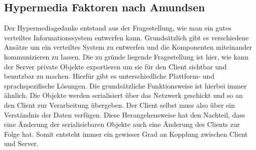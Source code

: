 \subsection{Hypermedia Faktoren nach Amundsen}
Der Hypermediagedanke entstand aus der Fragestellung, wie man ein gutes verteiltes Informationssystem entwerfen kann. Grundsätzlich gibt es verschiedene Ansätze um ein verteiltes System zu entwerfen und die Komponenten miteinander kommunizieren zu lassen. Die zu gründe liegende Fragestellung ist hier, wie kann der Server private Objekte exportieren um sie für den Client sichtbar und benutzbar zu machen. Hierfür gibt es unterschiedliche Plattform- und sprachspezifische Lösungen. Die grundsätzliche Funktionsweise ist hierbei immer ähnlich. Die Objekte werden serialisiert über das Netzwerk geschickt und so an den Client zur Verarbeitung übergeben. Der Client selbst muss also über ein Verständnis der Daten verfügen. Diese Herangehensweise hat den Nachteil, dass eine Änderung der serialisiebaren Objekte auch eine Änderung des Clients zur Folge hat. Somit entsteht immer ein gewisser Grad an Kopplung zwischen Client und Server.\\

